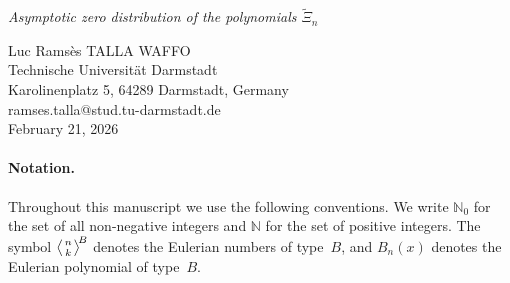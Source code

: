 \documentclass[12pt,twoside]{article}
\newcommand{\HeadTitleTwo}{\begin{center}
\Large{\textit{Asymptotic zero distribution of the polynomials $\widetilde{\Xi}_n$}}
\end{center}}
\newcommand{\EulerB}[2]{\left\langle {#1 \atop #2} \right\rangle^{\!B}}
\providecommand{\HeadTitleTwo}{} %
\begin{document}
\thispagestyle{fancy}

\vspace{0.2cm}

\begin{center}
\Large{\HeadTitleTwo}
\end{center}

\hspace{3cm}

\begin{center}
Luc Ramsès TALLA WAFFO \\
Technische Universität Darmstadt\\
Karolinenplatz 5, 64289 Darmstadt, Germany\\
ramses.talla@stud.tu-darmstadt.de\\
\vspace{0.5cm}
February 21, 2026
\end{center}

 
\begin{abstract}
We consider the polynomials $\Xi_n$ introduced in~\cite{TallaWaffo2025arxiv2511.02843} and studied in further details in\cite{TallaWaffo2026arxiv2602.16761}, which are expressed in terms of Eulerian polynomials of type~B, and study the zero distribution of the rescaled family
\[
  \widetilde{\Xi}_n(x) := \Xi_n(\sqrt{x}), \qquad n\ge 2.
\]
Writing the zeros of $\widetilde{\Xi}_n$ in the interval $(0,1)$ as
$0< x_{n,1} \le \cdots \le x_{n,n-1} < 1$ and forming the empirical measures
\[
  \mu_n := \frac1{n-1}\sum_{k=1}^{n-1}\delta_{x_{n,k}},
\]
we prove that $(\mu_n)_{n\ge2}$ converges weakly to a deterministic probability measure $\mu$ supported on $(0,1)$.
We give an explicit formula for the limiting density and the limiting distribution function of~$\mu$.
The proof is based on a representation of $\Xi_n$ in terms of type~B Eulerian polynomials, 
a ratio asymptotic for these polynomials derived from a classical series identity, and the
Stieltjes transform method.
We also provide numerical experiments illustrating the convergence of the empirical zero distributions to~$\mu$.
\end{abstract}

\vspace{0.2cm}

\paragraph{Notation.}
Throughout this manuscript we use the following conventions. 
We write $\mathbb{N}_0$ for the set of all non-negative integers and $\mathbb{N}$ for the set of positive integers. 
The symbol $\EulerB{n}{k}$ denotes the Eulerian numbers of type~$B$, and $B_n(x)$ denotes the Eulerian polynomial of type~$B$. 
\end{document}
